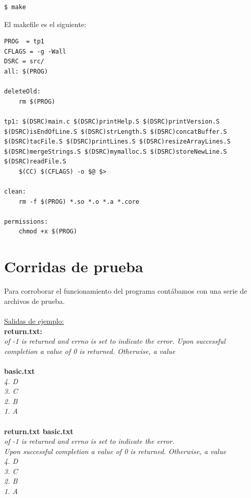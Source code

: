 \documentclass[a4paper,11pt]{article}
\begin{document}
\lstset{language=bash, breaklines=true, basicstyle=\normalsize}
\begin{lstlisting}
$ make
\end{lstlisting}

El makefile es el siguiente:
\begin{lstlisting}
PROG  = tp1
CFLAGS = -g -Wall
DSRC = src/
all: $(PROG)

deleteOld:
	rm $(PROG)

tp1: $(DSRC)main.c $(DSRC)printHelp.S $(DSRC)printVersion.S $(DSRC)isEndOfLine.S $(DSRC)strLength.S $(DSRC)concatBuffer.S $(DSRC)tacFile.S $(DSRC)printLines.S $(DSRC)resizeArrayLines.S  $(DSRC)mergeStrings.S $(DSRC)mymalloc.S $(DSRC)storeNewLine.S $(DSRC)readFile.S
	$(CC) $(CFLAGS) -o $@ $>

clean:
	rm -f $(PROG) *.so *.o *.a *.core
	
permissions:
	chmod +x $(PROG)

\end{lstlisting}


\section{Corridas de prueba}
Para corroborar el funcionamiento del programa cont\'abamos con una serie de archivos de prueba. 
\\
\\
\underline{Salidas de ejemplo:}\\
\textbf{return.txt:}\\
\emph{of -1 is returned and errno is set to indicate the error.
Upon successful completion a value of 0 is returned. Otherwise, a value}
\\\\
\textbf{basic.txt}\\
\emph{4. D\\
3. C\\
2. B\\
1. A\\}\\
\textbf{return.txt basic.txt}\\
\emph{of -1 is returned and errno is set to indicate the error.\\
Upon successful completion a value of 0 is returned. Otherwise, a value\\
4. D\\
3. C\\
2. B\\
1. A}\\
\end{document}
